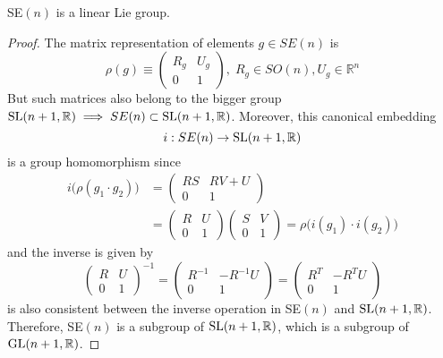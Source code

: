   \begin{theorem}
    SE$(n)$ is a linear Lie group. 
  \end{theorem}
  \begin{proof}
    The matrix representation of elements $g \in SE(n)$ is 
    \begin{equation}
      \rho(g) \equiv \begin{pmatrix}
      R_g & U_g \\ 0 & 1
      \end{pmatrix}, \; R_g \in SO(n), U_g \in \mathbb{R}^n
    \end{equation}
    But such matrices also belong to the bigger group $\operatorname{SL}(n+1, \mathbb{R}) \implies SE(n) \subset \operatorname{SL}(n+1, \mathbb{R})$. Moreover, this canonical embedding 
    \begin{equation}
      i: SE(n) \rightarrow \operatorname{SL}(n+1, \mathbb{R})
    \end{equation}
    is a group homomorphism since
    \begin{align*}
      i\big( \rho(g_1 \cdot g_2) \big) & = \begin{pmatrix}
      RS & RV + U \\ 0 & 1
      \end{pmatrix} \\
      & = \begin{pmatrix}
      R & U \\ 0 & 1
      \end{pmatrix} \begin{pmatrix}
      S & V \\ 0 & 1
      \end{pmatrix} = \rho \big( i(g_1) \cdot i(g_2) \big) 
    \end{align*}
    and the inverse is given by 
    \begin{equation}
      \begin{pmatrix}
      R & U \\ 0 & 1
      \end{pmatrix}^{-1} = \begin{pmatrix}
      R^{-1} & - R^{-1} U \\ 0 & 1
      \end{pmatrix} = \begin{pmatrix}
      R^T & - R^T U \\ 0 & 1
      \end{pmatrix}
    \end{equation}
    is also consistent between the inverse operation in SE$(n)$ and $\operatorname{SL}(n+1, \mathbb{R})$. Therefore, SE$(n)$ is a subgroup of $\operatorname{SL}(n+1, \mathbb{R})$, which is a subgroup of $\operatorname{GL}(n+1, \mathbb{R})$. 
  \end{proof}

